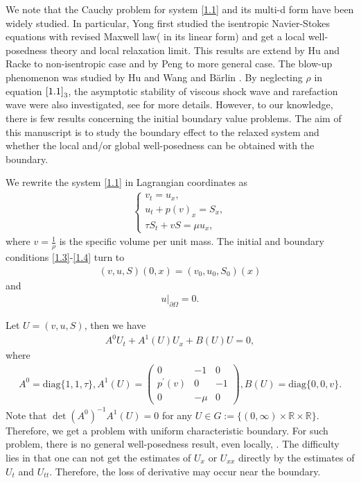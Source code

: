 \documentclass[10pt,reqno]{amsart}
\numberwithin{equation}{section}
\begin{document}
We note that the Cauchy problem for system \eqref{1.1} and its multi-d form have been widely studied. In particular, Yong \cite{YW14} first studied the isentropic Navier-Stokes equations with revised Maxwell law( in its linear form) and get a local well-posedness theory and local relaxation limit. This results are extend by Hu and Racke \cite{HR2017} to non-isentropic case and by Peng \cite{PY2020} to more general case. The blow-up phenomenon was studied by Hu and Wang \cite{HW2019, HW2020} and B\"arlin \cite{BJ2022}. By neglecting $\rho$ in equation $\eqref{1.1}_3$, the asymptotic stability of viscous shock wave and rarefaction wave were also investigated, see \cite{HW2022, HW2023, Frei2} for more details. However, to our knowledge, there is few results concerning the initial boundary value problems. The aim of this manuscript is to study the boundary effect to the relaxed system and whether the local and/or global well-posedness can be obtained with the boundary.


We rewrite the system \eqref{1.1} in Lagrangian coordinates as 
\begin{align}\label{1.5}
\begin{cases}
v_t=u_x,\\
u_t+p(v)_x=S_x,\\
\tau S_t +vS=\mu u_x,
\end{cases}
\end{align}
where $v=\frac{1}{\rho}$ is the specific volume per unit mass. The initial and boundary conditions \eqref{1.3}-\eqref{1.4} turn to 
\begin{align}\label{1.6}
(v, u, S)(0,x)=(v_0, u_0, S_0)(x)
\end{align}
and
\begin{align}\label{1.7}
u\big|_{\partial\Omega}=0.
\end{align}


Let $U=(v,u,S)$, then we have
\begin{align} \label{1.8}
A^0U_t+A^1(U) U_x+B(U)U=0,
\end{align}
where 
\begin{align*}
A^0=\mathrm{diag}\{1, 1, \tau\}, A^1(U)=
\begin{pmatrix}
0&-1&0\\
p^\prime(v)&0&-1\\
0&-\mu&0
\end{pmatrix},
B(U)=\mathrm{diag}\{0, 0, v\}.
\end{align*}
Note that $\det{ (A^0)^{-1}A^1(U)}=0$ for any $U \in G:=\{ (0, \infty)\times \mathbb R \times \mathbb R\}$. Therefore, we get a problem with uniform characteristic boundary. 
For such problem, there is no general well-posedness result, even locally, \cite{SCH86, Chen2007}.  
The difficulty lies in that one can not get the estimates of $U_x$ or $U_{xx}$ directly by the estimates of $U_t$ and $U_{tt}$. Therefore, the loss of derivative may occur near the boundary. 
\end{document}
